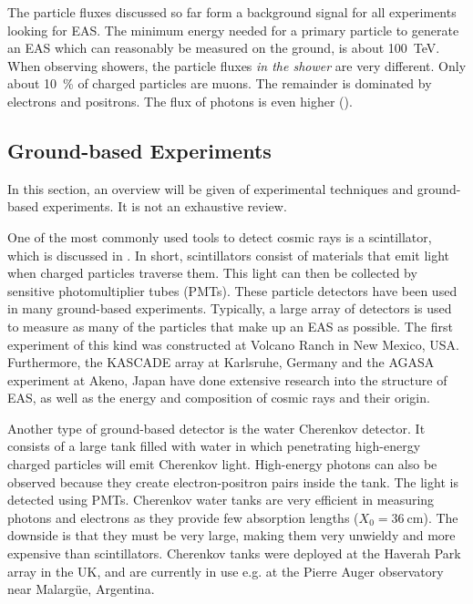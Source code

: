 The particle fluxes discussed so far form a background signal for all experiments
looking for EAS.  The minimum energy needed for a primary particle to generate an EAS
which can reasonably be measured on the ground, is about
\SI{100}{\tera\electronvolt}.  When observing showers, the particle fluxes
\emph{in the shower} are very different.  Only about \SI{10}{\percent} of
charged particles are muons.  The remainder is dominated by electrons
and positrons. The flux of photons is even higher
().


\subsection{Ground-based Experiments}
\label{sec:ground-based-experiments}

In this section, an overview will be given of experimental techniques and
ground-based experiments.  It is not an exhaustive review.

One of the most commonly used tools to detect cosmic rays is a
scintillator, which is discussed in .  In
short, scintillators consist of materials that emit light when charged particles
traverse them.  This light can then be collected by sensitive photomultiplier
tubes (PMTs).  These particle detectors have been used in many ground-based
experiments. Typically, a large array of detectors is used to measure as many
of the particles that make up an EAS as possible.  The first experiment of this kind was
constructed at Volcano Ranch in New Mexico, USA.  Furthermore, the KASCADE array
at Karlsruhe, Germany and the AGASA experiment at Akeno, Japan have done
extensive research into the structure of EAS, as well as the energy and composition of
cosmic rays and their origin.

Another type of ground-based detector is the water Cherenkov detector.  It
consists of a large tank filled with water in which penetrating high-energy
charged particles will emit Cherenkov light.  High-energy photons can also be
observed because they create electron-positron pairs inside the tank.  The light
is detected using PMTs.
Cherenkov water tanks are very efficient in measuring photons and electrons
as they provide few absorption lengths ($X_0 = \SI{36}{\centi\meter}$). The
downside is that they must be very large, making them very unwieldy and more
expensive than scintillators. Cherenkov tanks were deployed at the Haverah Park
array in the UK, and are currently in use e.g. at the Pierre Auger observatory near
Malargüe, Argentina.


